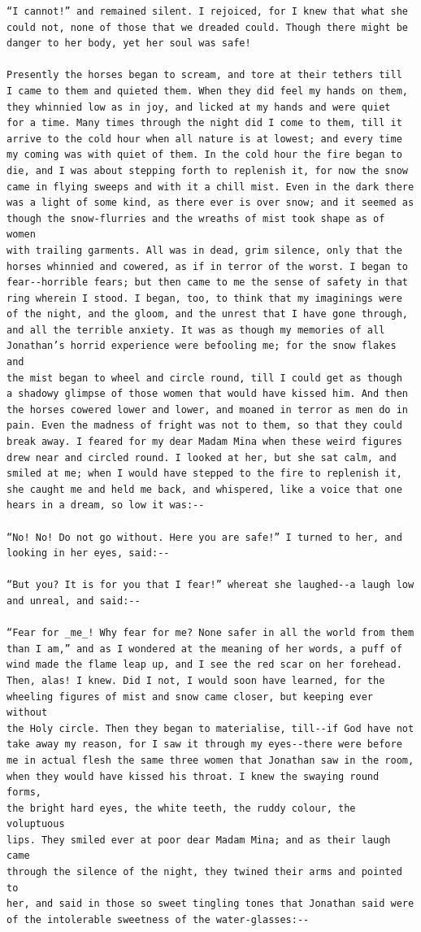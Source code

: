 \documentclass{article}
\begin{document}
\begin{verbatim}
“I cannot!” and remained silent. I rejoiced, for I knew that what she
could not, none of those that we dreaded could. Though there might be
danger to her body, yet her soul was safe!

Presently the horses began to scream, and tore at their tethers till
I came to them and quieted them. When they did feel my hands on them,
they whinnied low as in joy, and licked at my hands and were quiet
for a time. Many times through the night did I come to them, till it
arrive to the cold hour when all nature is at lowest; and every time
my coming was with quiet of them. In the cold hour the fire began to
die, and I was about stepping forth to replenish it, for now the snow
came in flying sweeps and with it a chill mist. Even in the dark there
was a light of some kind, as there ever is over snow; and it seemed as
though the snow-flurries and the wreaths of mist took shape as of women
with trailing garments. All was in dead, grim silence, only that the
horses whinnied and cowered, as if in terror of the worst. I began to
fear--horrible fears; but then came to me the sense of safety in that
ring wherein I stood. I began, too, to think that my imaginings were
of the night, and the gloom, and the unrest that I have gone through,
and all the terrible anxiety. It was as though my memories of all
Jonathan’s horrid experience were befooling me; for the snow flakes and
the mist began to wheel and circle round, till I could get as though
a shadowy glimpse of those women that would have kissed him. And then
the horses cowered lower and lower, and moaned in terror as men do in
pain. Even the madness of fright was not to them, so that they could
break away. I feared for my dear Madam Mina when these weird figures
drew near and circled round. I looked at her, but she sat calm, and
smiled at me; when I would have stepped to the fire to replenish it,
she caught me and held me back, and whispered, like a voice that one
hears in a dream, so low it was:--

“No! No! Do not go without. Here you are safe!” I turned to her, and
looking in her eyes, said:--

“But you? It is for you that I fear!” whereat she laughed--a laugh low
and unreal, and said:--

“Fear for _me_! Why fear for me? None safer in all the world from them
than I am,” and as I wondered at the meaning of her words, a puff of
wind made the flame leap up, and I see the red scar on her forehead.
Then, alas! I knew. Did I not, I would soon have learned, for the
wheeling figures of mist and snow came closer, but keeping ever without
the Holy circle. Then they began to materialise, till--if God have not
take away my reason, for I saw it through my eyes--there were before
me in actual flesh the same three women that Jonathan saw in the room,
when they would have kissed his throat. I knew the swaying round forms,
the bright hard eyes, the white teeth, the ruddy colour, the voluptuous
lips. They smiled ever at poor dear Madam Mina; and as their laugh came
through the silence of the night, they twined their arms and pointed to
her, and said in those so sweet tingling tones that Jonathan said were
of the intolerable sweetness of the water-glasses:--


\end{verbatim}
\end{document}
